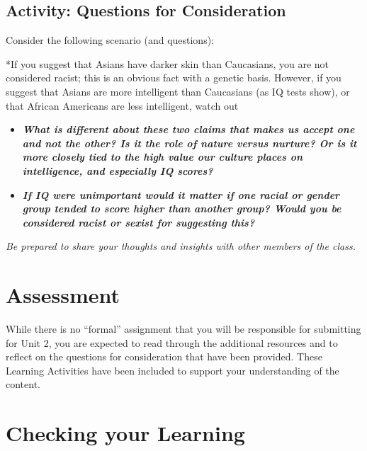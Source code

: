 \documentclass[
]{book}
\providecommand{\tightlist}{%
  \setlength{\itemsep}{0pt}\setlength{\parskip}{0pt}}
\begin{document}
\hypertarget{activity-questions-for-consideration-4}{%
\subsection*{Activity: Questions for Consideration}\label{activity-questions-for-consideration-4}}

\begin{reflect}
Consider the following scenario (and questions):

*If you suggest that Asians have darker skin than Caucasians, you are not considered racist; this is an obvious fact with a genetic basis. However, if you suggest that Asians are more intelligent than Caucasians (as IQ tests show), or that African Americans are less intelligent, watch out

\begin{itemize}
\tightlist
\item
  \textbf{\emph{What is different about these two claims that makes us accept one and not the other? Is it the role of nature versus nurture? Or is it more closely tied to the high value our culture places on intelligence, and especially IQ scores?}}
\item
  \textbf{\emph{If IQ were unimportant would it matter if one racial or gender group tended to score higher than another group? Would you be considered racist or sexist for suggesting this?}}
\end{itemize}

\emph{Be prepared to share your thoughts and insights with other members of the class.}
\end{reflect}

\hypertarget{assessment-1}{%
\section*{Assessment}\label{assessment-1}}

\begin{assessment}
While there is no ``formal'' assignment that you will be responsible for submitting for Unit 2, you are expected to read through the additional resources and to reflect on the questions for consideration that have been provided. These Learning Activities have been included to support your understanding of the content.
\end{assessment}

\hypertarget{checking-your-learning-1}{%
\section*{Checking your Learning}\label{checking-your-learning-1}}
\end{document}
